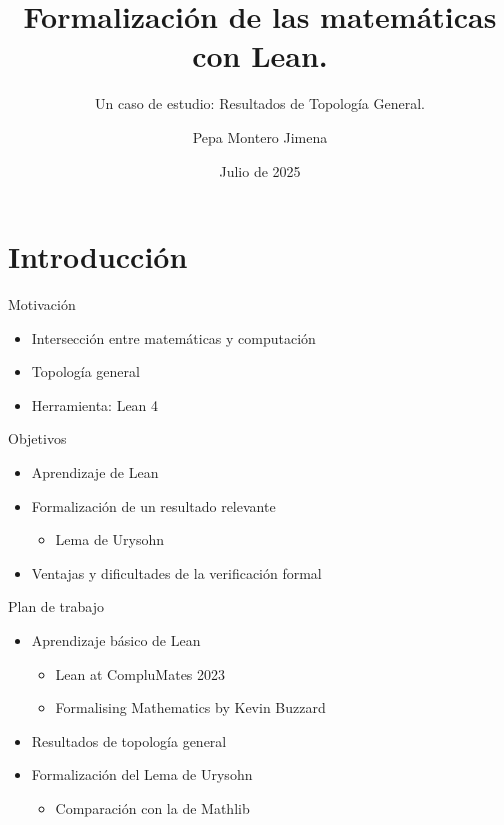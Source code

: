 \documentclass{beamer}
\title{Formalización de las matemáticas con Lean.}
\subtitle{Un caso de estudio: Resultados de Topología General.}
\author{Pepa Montero Jimena}
\institute[]{Facultad de Ciencias Matemáticas}
\date{Julio de 2025}
\begin{document}




\frame{\titlepage}



\section{Introducción}

\begin{frame}{Motivación}
  \begin{itemize}
    \item Intersección entre matemáticas y computación
    \item Topología general
    \item Herramienta: Lean 4
  \end{itemize}
\end{frame}

\begin{frame}{Objetivos}
  \begin{itemize}
    \item Aprendizaje de Lean
    \item Formalización de un resultado relevante
    \begin{itemize}
      \item Lema de Urysohn
    \end{itemize}
    \item Ventajas y dificultades de la verificación formal
  \end{itemize}
\end{frame}

\begin{frame}{Plan de trabajo}
  \begin{itemize}
    \item Aprendizaje básico de Lean
    \begin{itemize}
      \item Lean at CompluMates 2023
      \item Formalising Mathematics by Kevin Buzzard
    \end{itemize}
    \item Resultados de topología general
    \item Formalización del Lema de Urysohn
    \begin{itemize}
      \item Comparación con la de Mathlib
    \end{itemize}
  \end{itemize}
\end{frame}
\end{document}

